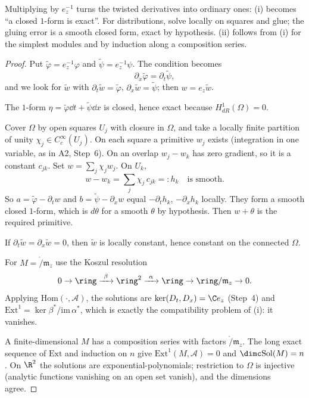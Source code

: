 \begin{proofidea}
Multiplying by $e_z^{-1}$ turns the twisted derivatives into ordinary ones: (i) becomes ``a closed $1$-form is exact''. For distributions, solve locally on squares and glue; the gluing error is a smooth closed form, exact by hypothesis. (ii) follows from (i) for the simplest modules and by induction along a composition series.
\end{proofidea}

\begin{proof}
Put $\tilde\varphi=e_z^{-1}\varphi$ and $\tilde\psi=e_z^{-1}\psi$. The condition becomes
\[
\partial_x\tilde\varphi=\partial_t\tilde\psi,
\]
and we look for $\tilde w$ with $\partial_t\tilde w=\tilde\varphi$, $\partial_x\tilde w=\tilde\psi$; then $w=e_z\tilde w$.

The $1$-form $\eta=\tilde\varphi\dd t+\tilde\psi\dd x$ is closed, hence exact because $H^1_{dR}(\Omega)=0$.

Cover $\Omega$ by open squares $U_j$ with closure in $\Omega$, and take a locally finite partition of unity $\chi_j\in C_c^\infty(U_j)$. On each square a primitive $w_j$ exists (integration in one variable, as in A2, Step~6). On an overlap $w_j-w_k$ has zero gradient, so it is a constant $c_{jk}$. Set $w=\sum_j\chi_jw_j$. On $U_k$,
\[
w-w_k=\sum_j\chi_j\,c_{jk}=:h_k\quad\text{is smooth.}
\]
So $a=\tilde\varphi-\partial_tw$ and $b=\tilde\psi-\partial_xw$ equal $-\partial_th_k$, $-\partial_xh_k$ locally. They form a smooth closed $1$-form, which is $d\theta$ for a smooth $\theta$ by hypothesis. Then $w+\theta$ is the required primitive.

If $\partial_t\tilde w=\partial_x\tilde w=0$, then $\tilde w$ is locally constant, hence constant on the connected $\Omega$.

For $M=\ring/\mathfrak m_z$ use the Koszul resolution
\[
0\to\ring\xrightarrow{\ \beta\ }\ring^2\xrightarrow{\ \alpha\ }\ring\to\ring/\mathfrak m_z\to0 .
\]
Applying $\mathrm{Hom}(\cdot,\mathcal A)$, the solutions are $\ker(D_t,D_x)=\C e_z$ (Step~4) and $\mathrm{Ext}^1=\ker\beta^*/\mathrm{im}\,\alpha^*$, which is exactly the compatibility problem of (i): it vanishes.

A finite-dimensional $M$ has a composition series with factors $\ring/\mathfrak m_z$. The long exact sequence of $\mathrm{Ext}$ and induction on $n$ give $\mathrm{Ext}^1(M,\mathcal A)=0$ and $\dimc\mathrm{Sol}(M)=n$. On $\R^2$ the solutions are exponential-polynomials; restriction to $\Omega$ is injective (analytic functions vanishing on an open set vanish), and the dimensions agree.

\end{proof}

